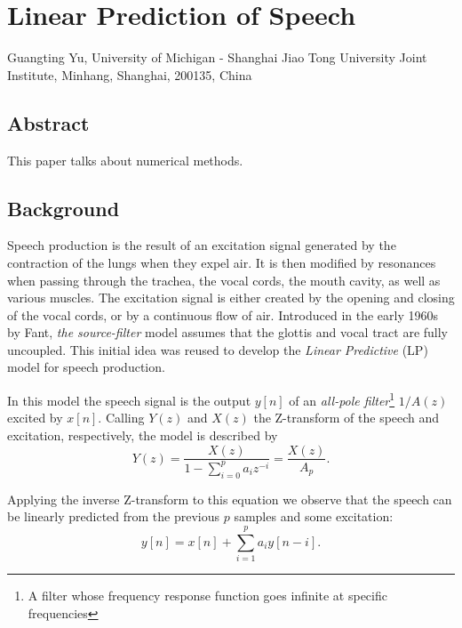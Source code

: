 \titleformat{\section}{\normalfont\large\bfseries}{\thesection}{1em}{}
\renewcommand{\chaptername}{Project}
\renewcommand{\thesection}{\arabic{section}}


\chapter{Linear Prediction of Speech}
\begin{center}
Guangting Yu, University of Michigan - Shanghai Jiao Tong University Joint Institute, Minhang, Shanghai, 200135, China
\end{center}


\section*{Abstract}
This paper talks about numerical methods.


\section{Background}
Speech production is the result of an excitation signal generated by the contraction of the lungs when they expel air.\cite{dutoit}
It is then modified by resonances when passing through the trachea, the vocal cords, the mouth cavity, as well as various muscles.\cite{tam59}
The excitation signal is either created by the opening and closing of the vocal cords, or by a continuous flow of air.\cite{gtm181}
Introduced in the early 1960s by Fant, \textit{the source-filter} model assumes that the glottis and vocal tract are fully uncoupled.\cite{corless}
This initial idea was reused to develop the \textit{Linear Predictive} (LP) model for speech production.\cite{tam39}

In this model the speech signal is the output \(y[n]\) of an \textit{all-pole filter}\footnote{A filter whose frequency response function goes infinite at specific frequencies} \(1/A(z)\) excited by \(x[n]\).\cite{golan}
Calling \(Y(z)\) and \(X(z)\) the Z-transform of the speech and excitation, respectively, the model is described by\cite{utm}
\begin{equation}
Y(z)=\frac{X(z)}{1-\sum_{i=0}^p a_i z^{-i}}=\frac{X(z)}{A_p}.
\end{equation}

Applying the inverse Z-transform to this equation we observe that the speech can be linearly predicted from the previous $p$ samples and some excitation:
\begin{equation}
y[n] = x[n]+\sum_{i=1}^p a_i y[n-i].
\end{equation}


